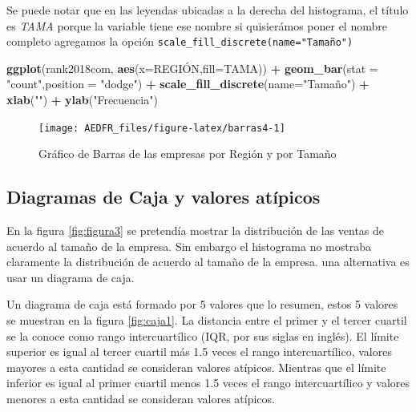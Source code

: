 \documentclass[letterpaper,]{book}
\newenvironment{Shaded}{\begin{snugshade}}{\end{snugshade}}
\newcommand{\DataTypeTok}[1]{\textcolor[rgb]{0.13,0.29,0.53}{#1}}
\newcommand{\KeywordTok}[1]{\textcolor[rgb]{0.13,0.29,0.53}{\textbf{#1}}}
\newcommand{\NormalTok}[1]{#1}
\newcommand{\OperatorTok}[1]{\textcolor[rgb]{0.81,0.36,0.00}{\textbf{#1}}}
\newcommand{\StringTok}[1]{\textcolor[rgb]{0.31,0.60,0.02}{#1}}
\begin{document}
Se puede notar que en las leyendas ubicadas a la derecha del histograma, el título es \emph{TAMA} porque la variable tiene ese nombre si quisierámos poner el nombre completo agregamos la opción \texttt{scale\_fill\_discrete(name="Tamaño")}

\begin{Shaded}
\begin{Highlighting}[]
\KeywordTok{ggplot}\NormalTok{(rank2018com, }\KeywordTok{aes}\NormalTok{(}\DataTypeTok{x=}\NormalTok{REGIÓN,}\DataTypeTok{fill=}\NormalTok{TAMA)) }\OperatorTok{+}\StringTok{ }
\StringTok{  }\KeywordTok{geom_bar}\NormalTok{(}\DataTypeTok{stat =} \StringTok{"count"}\NormalTok{,}\DataTypeTok{position =} \StringTok{"dodge"}\NormalTok{) }\OperatorTok{+}
\StringTok{  }\KeywordTok{scale_fill_discrete}\NormalTok{(}\DataTypeTok{name=}\StringTok{"Tamaño"}\NormalTok{) }\OperatorTok{+}\StringTok{ }
\StringTok{  }\KeywordTok{xlab}\NormalTok{(}\StringTok{""}\NormalTok{) }\OperatorTok{+}\StringTok{ }\KeywordTok{ylab}\NormalTok{(}\StringTok{"Frecuencia"}\NormalTok{)}
\end{Highlighting}
\end{Shaded}

\begin{figure}[h!]

{\centering \texttt{[image: AEDFR\_files/figure-latex/barras4-1]} 

}

\caption{Gráfico de Barras de las empresas por Región y por Tamaño}\label{fig:barras4}
\end{figure}

\hypertarget{boxes}{%
\subsection{Diagramas de Caja y valores atípicos}\label{boxes}}

En la figura \ref{fig:figura3} se pretendía mostrar la distribución de las ventas de acuerdo al tamaño de la empresa. Sin embargo el histograma no mostraba claramente la distribución de acuerdo al tamaño de la empresa. una alternativa es usar un diagrama de caja.

Un diagrama de caja está formado por 5 valores que lo resumen, estos 5 valores se muestran en la figura \ref{fig:caja1}. La distancia entre el primer y el tercer cuartil se la conoce como rango intercuartílico (IQR, por sus siglas en inglés). El límite superior es igual al tercer cuartil más 1.5 veces el rango intercuartílico, valores mayores a esta cantidad se consideran valores atípicos. Mientras que el límite inferior es igual al primer cuartil menos 1.5 veces el rango intercuartílico y valores menores a esta cantidad se consideran valores atípicos.
\end{document}
